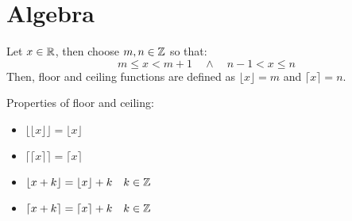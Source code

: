 \chapter{Algebra}

\begin{definition}
    Let $x \in \mathbb{R}$, then choose $m,n \in \mathbb{Z}$ so that:
    \begin{equation}
        m \le x < m + 1 \quad \land \quad n - 1 < x \le n
    \end{equation}
    Then, floor and ceiling functions are defined as 
    $\lfloor x \rfloor = m$ and 
    $\lceil x \rceil = n$.
\end{definition}

\begin{corollary}
    Properties of floor and ceiling:
    \begin{itemize}
        \item $\lfloor \lfloor x \rfloor \rfloor = \lfloor x \rfloor$
        \item $\lceil \lceil x \rceil \rceil = \lceil x \rceil$
        \item $\lfloor x + k \rfloor = \lfloor x \rfloor + k \quad k \in \mathbb{Z}$
        \item $\lceil x + k \rceil = \lceil x \rceil + k \quad k \in \mathbb{Z}$
    \end{itemize}
\end{corollary}
